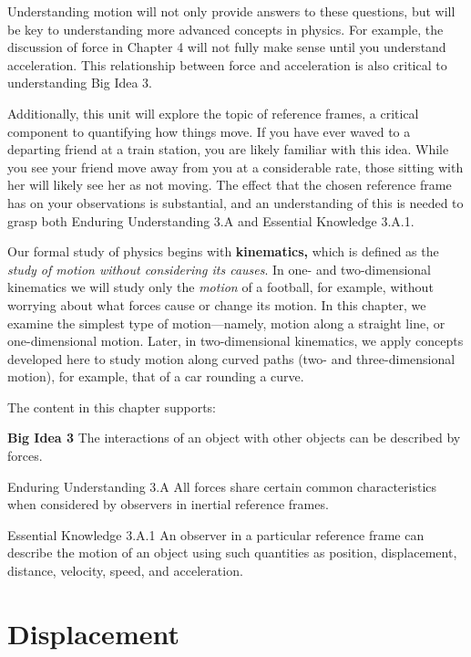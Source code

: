 \documentclass[
]{book}
\begin{document}
Understanding motion will not only provide answers to these questions,
but will be key to understanding more advanced concepts in physics. For
example, the discussion of force in Chapter 4 will not fully make sense
until you understand acceleration. This relationship between force and
acceleration is also critical to understanding Big Idea 3.

Additionally, this unit will explore the topic of reference frames, a
critical component to quantifying how things move. If you have ever
waved to a departing friend at a train station, you are likely familiar
with this idea. While you see your friend move away from you at a
considerable rate, those sitting with her will likely see her as not
moving. The effect that the chosen reference frame has on your
observations is substantial, and an understanding of this is needed to
grasp both Enduring Understanding 3.A and Essential Knowledge 3.A.1.

Our formal study of physics begins with \textbf{kinematics,} which is defined
as the \emph{study of motion without considering its causes}. In one- and
two-dimensional kinematics we will study only the \emph{motion} of a
football, for example, without worrying about what forces cause or
change its motion. In this chapter, we examine the simplest type of
motion---namely, motion along a straight line, or one-dimensional
motion. Later, in two-dimensional kinematics, we apply concepts
developed here to study motion along curved paths (two- and
three-dimensional motion), for example, that of a car rounding a curve.

The content in this chapter supports:

\textbf{Big Idea 3} The interactions of an object with other objects can be
described by forces.

Enduring Understanding 3.A All forces share certain common
characteristics when considered by observers in inertial reference
frames.

Essential Knowledge 3.A.1 An observer in a particular reference frame
can describe the motion of an object using such quantities as position,
displacement, distance, velocity, speed, and acceleration.

\hypertarget{concept-trailer-1d-kinematics}{}

\hypertarget{displacement}{%
\section{Displacement}\label{displacement}}
\end{document}
